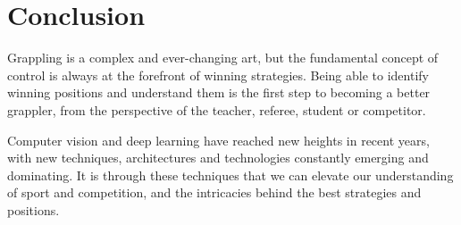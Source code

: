 \documentclass[a4paper, oneside, 11pt]{article}
\begin{document}
\section{Conclusion}

Grappling is a complex and ever-changing art, but the fundamental concept of control is always at the forefront of winning strategies. Being able to identify winning positions and understand them is the first step to becoming a better grappler, from the perspective of the teacher, referee, student or competitor.

Computer vision and deep learning have reached new heights in recent years, with new techniques, architectures and technologies constantly emerging and dominating. It is through these techniques that we can elevate our understanding of sport and competition, and the intricacies behind the best strategies and positions.

\newpage

\printbibliography
\end{document}
